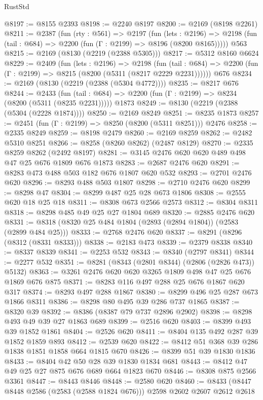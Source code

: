 \begin{lexlean}{RustStd}
\begin{coremodule}
{\begin{coremodule}
{{{{{{{{{{{{{{{@8197 := @8155 @2393
@8198 := @2240 @8197
@8200 := @2169 (@8198 @2261)
@8211 := @2387
    (fun (rty : @561) =>
    @2197
      (fun (lets : @2196) =>
      @2198 (fun (tail : @684) => @2200 (fun (Γ : @2199) => @8196 (@8200 @8165)))))
    @563
@8215 := @2169 (@8130 (@2219 (@2388 @5305)))
@8217 := @5312 @8160 @6624
@8229 := @2409
    (fun (lets : @2196) =>
    @2198
      (fun (tail : @684) => @2200 (fun (Γ : @2199) => @8215 (@8200 (@5311 (@8217 @2229 @2231))))))
    @676
@8234 := @2169 (@8130 (@2219 (@2388 (@5304 @4772))))
@8235 := @8217 @676
@8244 := @2433
    (fun (tail : @684) => @2200 (fun (Γ : @2199) => @8234 (@8200 (@5311 (@8235 @2231)))))
    @1873
@8249 := @8130 (@2219 (@2388 (@5304 (@2228 @1874))))
@8250 := @2169 @8249
@8251 := @8235 @1873
@8257 := @2451 (fun (Γ : @2199) => @8250 (@8200 (@5311 @8251))) @2476
@8258 := @2335 @8249
@8259 := @8198 @2479
@8260 := @2169 @8259
@8262 := @2482 @5310 @8251
@8266 := @8258 (@8260 @8262) (@2487 @8129)
@8270 := @2335 @8259 @8262 (@2492 @8197)
@8281 := @3145 @2476 @620 @620 @489 @498 @47 @25 @676 @1809 @676 @1873
@8283 := @2687 @2476 @620
@8291 := @8283 @473 @488 @503 @182 @676 @1807 @620 @532
@8293 := @2701 @2476 @620
@8296 := @8293 @488 @503 @1807
@8298 := @2710 @2476 @620
@8299 := @8298 @47
@8304 := @8299 @487 @25 @28 @673 @1806
@8308 := @2555 @620 @18 @25 @18
@8311 := @8308 @673 @2566 @2573
@8312 := @8304 @8311
@8318 := @8298 @485 @49 @25 @27 @1804 @689
@8320 := @2885 @2476 @620
@8331 := @8318 (@8320 @25 @484 @1804 (@2893 (@2894 @1804)) (@2583 (@2899 @484 @25)))
@8333 := @2768 @2476 @620
@8337 := @8291 (@8296 (@8312 (@8331 @8333)))
@8338 := @2183 @473
@8339 := @2379 @8338
@8340 := @8337 @8339
@8341 := @2253 @532
@8343 := @8340 (@2797 @8341)
@8344 := @2277 @532
@8351 := @8281 (@8343 (@2801 @8344) (@2806 (@2826 @473)) @5132)
@8363 := @3261 @2476 @620 @620 @3265 @1809 @498 @47 @25 @676 @1869 @676 @875
@8371 := @8283 @116 @497 @288 @25 @676 @1867 @620 @317
@8374 := @8293 @497 @288 @1867
@8380 := @8299 @496 @25 @287 @673 @1866 @8311
@8386 := @8298 @80 @495 @39 @286 @737 @1865
@8387 := @8320 @39
@8392 := @8386 (@8387 @79 @737 @2896 @2902)
@8398 := @8298 @493 @49 @39 @27 @1863 @689
@8399 := @2516 @620
@8403 := @8399 @493 @39 @1852 @1861
@8404 := @2526 @620
@8411 := @8404 @135 @492 @287 @39 @1852 @1859 @893
@8412 := @2539 @620
@8422 := @8412 @51 @368 @39 @286 @1838 @1851 @1858 @664 @1815 @670
@8426 := @8399 @51 @39 @1830 @1836
@8433 := @8404 @42 @50 @28 @39 @1830 @1834 @681
@8443 := @8412 @47 @49 @25 @27 @875 @676 @689 @664 @1823 @670
@8446 := @8308 @875 @2566 @3361
@8447 := @8443 @8446
@8448 := @2580 @620
@8460 := @8433 (@8447 @8448 @2586 (@2583 (@2588 @1824 @676))) @2598 @2602 @2607 @2612 @2618
}}}}}}}}}}}}}}}
\end{coremodule}}
\end{coremodule}
\end{lexlean}
